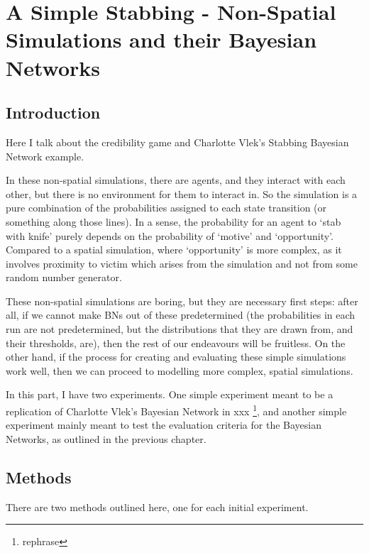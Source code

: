  

\chapter[Simple Non-Spatial Simulations]{A Simple Stabbing - Non-Spatial Simulations and their Bayesian Networks}

\section{Introduction}
Here I talk about the credibility game and Charlotte Vlek's Stabbing Bayesian Network example.

In these non-spatial simulations, there are agents, and they interact with each other, but there is no environment for them to interact in. So the simulation is a pure combination of the probabilities assigned to each state transition (or something along those lines). In a sense, the probability for an agent to `stab with knife' purely depends on the probability of `motive' and `opportunity'. Compared to a spatial simulation, where `opportunity' is more complex, as it involves proximity to victim which arises from the simulation and not from some random number generator.

These non-spatial simulations are boring, but they are necessary first steps: after all, if we cannot make BNs out of these predetermined (the probabilities in each run are not predetermined, but the distributions that they are drawn from, and their thresholds, are), then the rest of our endeavours will be fruitless. On the other hand, if the process for creating and evaluating these simple simulations work well, then we can proceed to modelling more complex, spatial simulations.

In this part, I have two experiments. One simple experiment meant to be a replication of Charlotte Vlek's Bayesian Network in xxx \footnote{rephrase}, and another simple experiment mainly meant to test the evaluation criteria for the Bayesian Networks, as outlined in the previous chapter.

\section{Methods}
There are two methods outlined here, one for each initial experiment.

